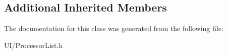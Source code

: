 \subsection*{Additional Inherited Members}


The documentation for this class was generated from the following file\-:\begin{DoxyCompactItemize}
\item 
U\-I/Processor\-List.\-h\end{DoxyCompactItemize}
